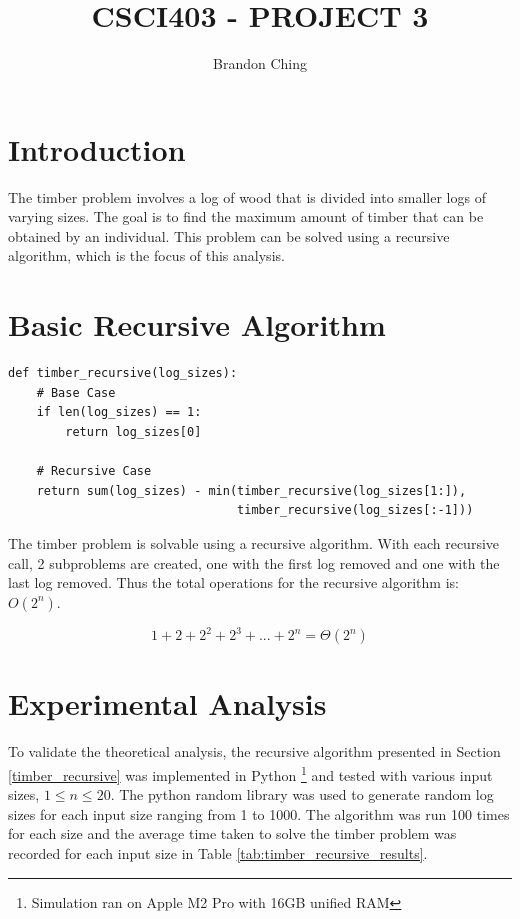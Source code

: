 \documentclass[12pt]{article}
\title{\uppercase{CSCI403 - Project 3}}
\author{Brandon Ching}
\begin{document}
\section{Introduction}
The timber problem involves a log of wood that is divided into smaller logs of varying sizes. The goal is to find the maximum amount of timber that can be obtained by an individual. This problem can be solved using a recursive algorithm, which is the focus of this analysis.

\section{Basic Recursive Algorithm}
\begin{verbatim}
def timber_recursive(log_sizes):
    # Base Case
    if len(log_sizes) == 1:
        return log_sizes[0]

    # Recursive Case
    return sum(log_sizes) - min(timber_recursive(log_sizes[1:]),
                                timber_recursive(log_sizes[:-1]))
\end{verbatim}
\label{timber_recursive}

The timber problem is solvable using a recursive algorithm. With each recursive call, 2 subproblems are created, one with the first log removed and one with the last log removed. Thus the total operations for the recursive algorithm is: $O(2^n)$.

\begin{equation}
    1 + 2 + 2^2 + 2^3 + ... + 2^n = \Theta(2^n)
\end{equation}

\section{Experimental Analysis}
To validate the theoretical analysis, the recursive algorithm presented in Section \ref*{timber_recursive} was implemented in Python \footnote{Simulation ran on Apple M2 Pro with 16GB unified RAM} and tested with various input sizes, $1 \leq n \leq 20$. The python random library was used to generate random log sizes for each input size ranging from 1 to 1000. The algorithm was run 100 times for each size and the average time taken to solve the timber problem was recorded for each input size in Table \ref{tab:timber_recursive_results}.
\end{document}
